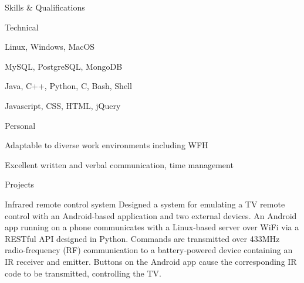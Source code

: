 \documentclass{resume} %
\begin{document}

\begin{rSection}{Skills \& Qualifications}
\begin{rSubQualificationsSection}{Technical}   %
	\item Linux, Windows, MacOS
	\item MySQL, PostgreSQL, MongoDB
	\item Java, C++, Python, C, Bash, Shell%
	\item Javascript, CSS, HTML, jQuery
\end{rSubQualificationsSection}

\begin{rSubQualificationsSection}{Personal}
	\item Adaptable to diverse work environments including WFH
	\item Excellent written and verbal communication, time management
\end{rSubQualificationsSection}



	\begin{rSubsection}{Projects}
		\begin{rProject}{Infrared remote control system}
			Designed a system for emulating a TV remote control with an Android-based application and two external devices. An Android app running on a phone communicates with a Linux-based server over WiFi via a RESTful API designed in Python. Commands are transmitted over 433MHz radio-frequency (RF) communication to a battery-powered device containing an IR receiver and emitter. Buttons on the Android app cause the corresponding IR code to be transmitted, controlling the TV. 
		\end{rProject}
	\end{rSubsection}
\end{rSection}
\end{document}
